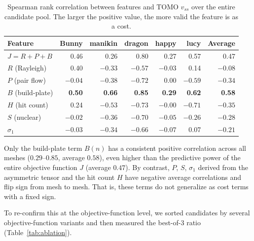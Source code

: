 \documentclass[11pt,a4paper]{article}
\begin{document}
\begin{table}[H]
\centering
\caption{Spearman rank correlation between features and TOMO $v_{ss}$ over the entire candidate pool.
The larger the positive value, the more valid the feature is as a cost.}
\label{tab:feature-corr}
\begin{tabular}{lrrrrrr}
\toprule
Feature & Bunny & manikin & dragon & happy & lucy & Average\\
\midrule
$J=R{+}P{+}B$         & 0.46 & 0.26 & 0.80 & 0.27 & 0.57 & 0.47\\
$R$ (Rayleigh)        & 0.40 & $-0.33$ & $-0.57$ & $-0.03$ & 0.14 & $-0.08$\\
$P$ (pair flow)       & $-0.04$ & $-0.38$ & $-0.72$ & 0.00 & $-0.59$ & $-0.34$\\
$B$ (build-plate)     & \textbf{0.50} & \textbf{0.66} & \textbf{0.85} & \textbf{0.29} & \textbf{0.62} & \textbf{0.58}\\
$H$ (hit count)       & 0.24 & $-0.53$ & $-0.73$ & $-0.00$ & $-0.71$ & $-0.35$\\
$S$ (nuclear)         & $-0.02$ & $-0.36$ & $-0.70$ & $-0.05$ & $-0.26$ & $-0.28$\\
$\sigma_1$            & $-0.03$ & $-0.34$ & $-0.66$ & $-0.07$ & 0.07 & $-0.21$\\
\bottomrule
\end{tabular}
\end{table}

Only the build-plate term $B(n)$ has a consistent positive correlation across all meshes ($0.29$--$0.85$, average $0.58$),
even higher than the predictive power of the entire objective function $J$ (average $0.47$).
By contrast, $P$, $S$, $\sigma_1$ derived from the asymmetric tensor and the hit count $H$ have negative average correlations
and flip sign from mesh to mesh. That is, these terms do not generalize as cost terms with a fixed sign.

To re-confirm this at the objective-function level, we sorted candidates by several objective-function variants and then
measured the best-of-3 ratio (Table~\ref{tab:ablation}).
\end{document}
